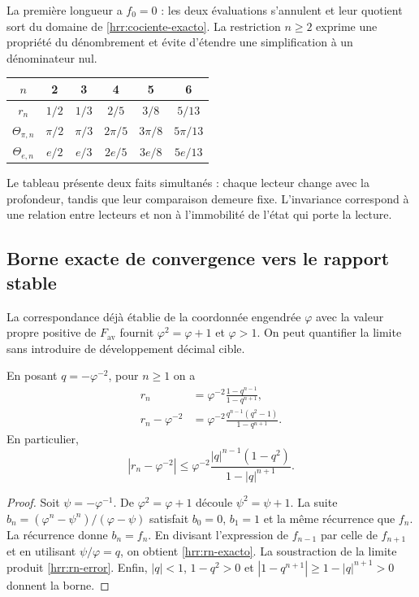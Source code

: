 La première longueur a \(f_0=0\) : les deux évaluations s’annulent et leur quotient sort du domaine de \eqref{hrr:cociente-exacto}. La restriction \(n\geq2\) exprime une propriété du dénombrement et évite d’étendre une simplification à un dénominateur nul.

\begin{center}
\begin{tabular}{c|ccccc}
\(n\)&2&3&4&5&6\\\hline
\(r_n\)&\(1/2\)&\(1/3\)&\(2/5\)&\(3/8\)&\(5/13\)\\
\(\Theta_{\pi,n}\)&\(\pi/2\)&\(\pi/3\)&\(2\pi/5\)&\(3\pi/8\)&\(5\pi/13\)\\
\(\Theta_{e,n}\)&\(e/2\)&\(e/3\)&\(2e/5\)&\(3e/8\)&\(5e/13\)
\end{tabular}
\end{center}
Le tableau présente deux faits simultanés : chaque lecteur change avec la profondeur, tandis que leur comparaison demeure fixe. L’invariance correspond à une relation entre lecteurs et non à l’immobilité de l’état qui porte la lecture.

\subsection{Borne exacte de convergence vers le rapport stable}

La correspondance déjà établie de la coordonnée engendrée \(\varphi\) avec la valeur propre positive de \(F_{\mathrm{av}}\) fournit \(\varphi^2=\varphi+1\) et \(\varphi>1\). On peut quantifier la limite sans introduire de développement décimal cible.

\begin{proposition}
\label{hrr:error-retorno} En posant \(q=-\varphi^{-2}\), pour \(n\geq1\) on a
\begin{align}
 r_n&=\varphi^{-2}\frac{1-q^{n-1}}{1-q^{n+1}},
 \label{hrr:rn-exacto}\\
 r_n-\varphi^{-2}
 &=\varphi^{-2}
 \frac{q^{n-1}(q^2-1)}{1-q^{n+1}}.
 \label{hrr:rn-error}
\end{align}
En particulier,
\begin{equation}
 |r_n-\varphi^{-2}|
 \leq\varphi^{-2}
 \frac{|q|^{n-1}(1-q^2)}{1-|q|^{n+1}}.
 \label{hrr:rn-cota}
\end{equation}
\end{proposition}
\begin{proof}
Soit \(\psi=-\varphi^{-1}\). De \(\varphi^2=\varphi+1\) découle \(\psi^2=\psi+1\). La suite \(b_n=(\varphi^n-\psi^n)/(\varphi-\psi)\) satisfait \(b_0=0\), \(b_1=1\) et la même récurrence que \(f_n\). La récurrence donne \(b_n=f_n\). En divisant l’expression de \(f_{n-1}\) par celle de \(f_{n+1}\) et en utilisant \(\psi/\varphi=q\), on obtient \eqref{hrr:rn-exacto}. La soustraction de la limite produit \eqref{hrr:rn-error}. Enfin, \(|q|<1\), \(1-q^2>0\) et \(|1-q^{n+1}|\geq1-|q|^{n+1}>0\) donnent la borne.
\end{proof}

